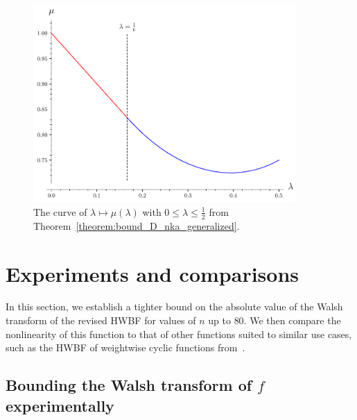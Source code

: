 \documentclass[11pt]{llncs}
\begin{document}
\begin{figure}
	\centering
	\includegraphics[width=10cm]{curve_exponents_lambda_mu.pdf}
	\caption{The curve of $\lambda\mapsto\mu(\lambda)$ with $0\leq\lambda\leq\frac 12$ from Theorem~\ref{theorem:bound_D_nka_generalized}.}
	\label{fig:curve_exponents_lambda_mu}
\end{figure}



\section{Experiments and comparisons}

In this section, we establish a tighter bound on the absolute value of the Walsh transform of the revised HWBF for values of $n$ up to $80$. 
We then compare the nonlinearity of this function to that of other functions suited to similar use cases, such as the HWBF of weightwise cyclic functions from~\cite{DAM:MeaOza24}.

\subsection{Bounding the Walsh transform of $f$ experimentally}\label{sec:expwt}

\end{document}
